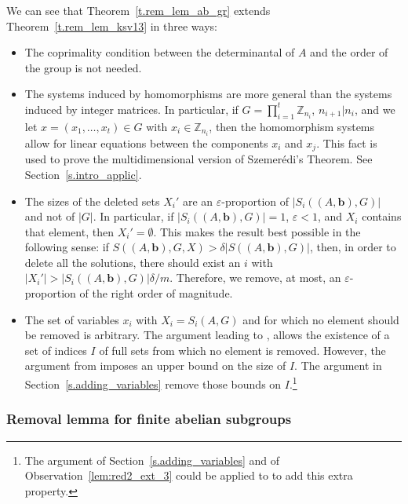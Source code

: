 \documentclass[10pt]{article}
\newcommand{\Z}{\mathbb Z}
\begin{document}
We can see that Theorem~\ref{t.rem_lem_ab_gr} extends Theorem~\ref{t.rem_lem_ksv13} in three ways: 
\begin{itemize}
	\item The coprimality condition between the determinantal of $A$ 
	and the order of the group is not needed.
	\item The systems induced by homomorphisms are more general than the systems induced by integer matrices. In particular, if $G=\prod_{i=1}^t\Z_{n_i}$, $n_{i+1}|n_i$, and we let $x=(x_1,\ldots,x_t)\in G$ with $x_i\in \Z_{n_i}$, then the homomorphism systems allow for linear equations between the components $x_i$ and $x_j$. This fact is used 
	to prove the multidimensional version of Szemer\'edi's Theorem. See Section~\ref{s.intro_applic}.
	\item The sizes of the deleted sets $X_i'$ are an $\varepsilon$-proportion of $|S_i((A,\mathbf{b}),G)|$ and not of $|G|$. 
	In particular, if $|S_i((A,\mathbf{b}),G)|=1$, $\varepsilon<1$, and $X_i$ contains that element, then $X_i'=\emptyset$. 
	This makes the result best possible in the following sense: if $S((A,\mathbf{b}),G,X)>\delta |S((A,\mathbf{b}),G)|$, then, in order to delete all the solutions, there should exist an $i$ with $|X_i'|> |S_i((A,\mathbf{b}),G)| \delta/m$. Therefore, we remove, at most, an $\varepsilon$-proportion of the right order of magnitude.
	\item The set of variables $x_i$ with $X_i=S_i(A,G)$ and for which no element should be removed is arbitrary. The argument leading to \cite[Theorem~1]{ksv13}, allows the existence of a set of indices $I$ of full sets from which no element is removed. However, the argument from \cite{ksv13} imposes an upper bound on the size of $I$. The argument in Section~\ref{s.adding_variables} remove those bounds on $I$.\footnote{The argument of Section~\ref{s.adding_variables} and of Observation~\ref{lem:red2_ext_3} could be applied to \cite[Theorem~1]{ksv13} to add this extra property.}
\end{itemize}


\subsubsection{Removal lemma for finite abelian subgroups}
\end{document}
